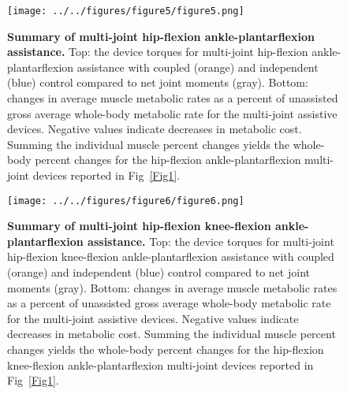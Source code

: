 \documentclass[10pt,letterpaper]{article}
\begin{document}
\begin{figure}[!h]
\begin{adjustwidth}{-1in}{0in} %
    \centering
    \texttt{[image: ../../figures/figure5/figure5.png]}
    \caption{{\bf Summary of multi-joint hip-flexion ankle-plantarflexion assistance.}
        Top: the device torques for multi-joint hip-flexion ankle-plantarflexion assistance with coupled (orange) and independent (blue) control compared to net joint moments (gray). Bottom: changes in average muscle metabolic rates as a percent of unassisted gross average whole-body metabolic rate for the multi-joint assistive devices. Negative values indicate decreases in metabolic cost. Summing the individual muscle percent changes yields the whole-body percent changes for the hip-flexion ankle-plantarflexion multi-joint devices reported in Fig~\ref{Fig1}.}
\label{Fig5}
\end{adjustwidth}
\end{figure}    

\begin{figure}[!h]
\begin{adjustwidth}{-1in}{0in} %
    \centering
    \texttt{[image: ../../figures/figure6/figure6.png]}
    \caption{{\bf Summary of multi-joint hip-flexion knee-flexion ankle-plantarflexion assistance.}
        Top: the device torques for multi-joint hip-flexion knee-flexion ankle-plantarflexion assistance with coupled (orange) and independent (blue) control compared to net joint moments (gray). Bottom: changes in average muscle metabolic rates as a percent of unassisted gross average whole-body metabolic rate for the multi-joint assistive devices. Negative values indicate decreases in metabolic cost. Summing the individual muscle percent changes yields the whole-body percent changes for the hip-flexion knee-flexion ankle-plantarflexion multi-joint devices reported in Fig~\ref{Fig1}.}
\label{Fig6}
\end{adjustwidth}
\end{figure}
\end{document}
